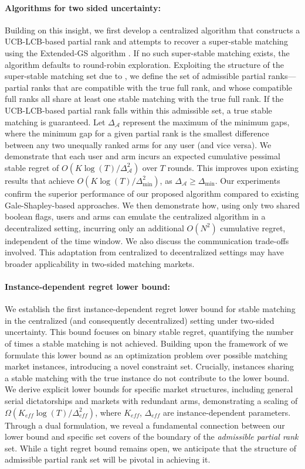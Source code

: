 \documentclass{article}
\begin{document}
\paragraph{Algorithms for two sided uncertainty:} Building on this insight, we first develop a centralized algorithm that constructs a UCB-LCB-based partial rank and attempts to recover a super-stable matching using the Extended-GS algorithm \cite{irving1994stable}. If no such super-stable matching exists, the algorithm defaults to round-robin exploration.  Exploiting the structure of the super-stable matching set due to \cite{spieker1995set}, we define the set of admissible partial ranks—partial ranks that are compatible with the true full rank, and whose compatible full ranks all share at least one stable matching with the true full rank. If the UCB-LCB-based partial rank falls within this admissible set, a true stable matching is guaranteed. Let $\Delta_{\mathcal{A}}$ represent the maximum of the minimum gaps, where the minimum gap for a given partial rank is the smallest difference between any two unequally ranked arms for any user (and vice versa). We demonstrate that each user and arm incurs an expected cumulative pessimal stable regret of $O(K\log(T) / \Delta^2_{\mathcal{A}})$ over $T$ rounds. This improves upon existing results that achieve $O(K\log(T) / \Delta^2_{\min})$, as $\Delta_{\mathcal{A}} \geq \Delta_{\min}$. Our experiments confirm the superior performance of our proposed algorithm compared to existing Gale-Shapley-based approaches.  We then demonstrate how, using only two shared boolean flags, users and arms can emulate the centralized algorithm in a decentralized setting, incurring only an additional $O(N^2)$ cumulative regret, independent of the time window. We also discuss the communication trade-offs involved. This adaptation from centralized to decentralized settings may have broader applicability in two-sided matching markets. 

\paragraph{Instance-dependent regret lower bound:} We establish the first instance-dependent regret lower bound for stable matching in the centralized (and consequently decentralized) setting under two-sided uncertainty. This bound focuses on binary stable regret, quantifying the number of times a stable matching is not achieved.  Building upon the framework of  \cite{combes2017minimal} we formulate this lower bound as an optimization problem over possible matching market instances, introducing a novel constraint set.  Crucially, instances sharing a stable matching with the true instance do not contribute to the lower bound. We derive explicit lower bounds for specific market structures, including general serial dictatorships and markets with redundant arms, demonstrating a scaling of  $\Omega(K_{eff} \log(T)/\Delta_{eff}^2)$, where $K_{eff}$, $\Delta_{eff}$ are instance-dependent parameters. Through a dual formulation, we reveal a fundamental connection between our lower bound and specific set covers of the boundary of the {\em admissible partial rank} set. While a tight regret bound remains open, we anticipate that the structure of  admissible partial rank set will be pivotal in achieving it.
\end{document}
